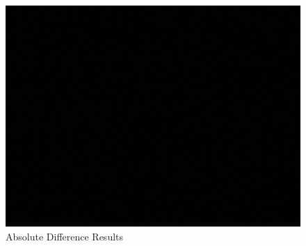 		\begin{figure}[H]
			\includegraphics[width=\linewidth]{figsrc/simulation/normal/orb_absdiff.png}
			\caption{Absolute Difference Results}
			\label{fig:siftAbsDifference}
		\end{figure}

